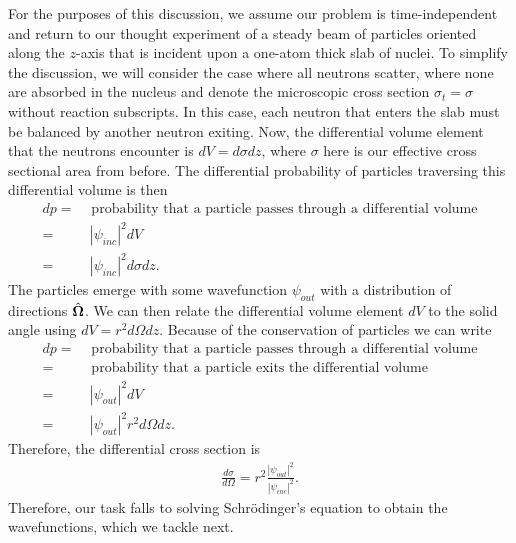 For the purposes of this discussion, we assume our problem is time-independent and return to our thought experiment of a steady beam of particles oriented along the $z$-axis that is incident upon a one-atom thick slab of nuclei. To simplify the discussion, we will consider the case where all neutrons scatter, where none are absorbed in the nucleus and denote the microscopic cross section $\sigma_t = \sigma$ without reaction subscripts. In this case, each neutron that enters the slab must be balanced by another neutron exiting. Now, the differential volume element that the neutrons encounter is $dV = d\sigma dz$, where $\sigma$ here is our effective cross sectional area from before. The differential probability of particles traversing this differential volume is then
\begin{align}
  dp = &\text{ probability that a particle passes through a differential volume} \nonumber \\
     = &\ | \psi_{inc} |^2 dV \nonumber \\
     = &\ | \psi_{inc} |^2 d\sigma dz.
\end{align}
The particles emerge with some wavefunction $\psi_{out}$ with a distribution of directions $\hat{\mathbf{\Omega}}$. We can then relate the differential volume element $dV$ to the solid angle using $dV = r^2 d\Omega dz$. Because of the conservation of particles we can write
\begin{align}
  dp = &\text{ probability that a particle passes through a differential volume} \nonumber \\
     = &\text{ probability that a particle exits the differential volume} \nonumber \\
     = &\ | \psi_{out} |^2 dV  \nonumber \\
     = &\ | \psi_{out} |^2 r^2 d\Omega dz.
\end{align}
Therefore, the differential cross section is
\begin{align} \label{Eq:nuclearData_DifferentialXS_RatioWavefunctions}
  \frac{d\sigma}{d\Omega} = r^2 \frac{ | \psi_{out} |^2 }{ | \psi_{inc} |^2 } .
\end{align}
Therefore, our task falls to solving Schr\"{o}dinger's equation to obtain the wavefunctions, which we tackle next.



